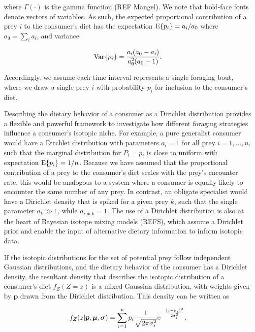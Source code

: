 \documentclass{frontiersSCNS}
\begin{document}
\noindent where $\Gamma(\cdot)$ is the gamma function (REF Mangel).
We note that bold-face fonts denote vectors of variables.
As such, the expected proportional contribution of a prey $i$ to the consumer's diet has the expectation ${\rm E}\{p_i\}=a_i/a_0$ where $a_0 = \sum_i a_i$, and variance

\begin{equation}
  \label{eqDirVar}
  {\rm Var}\{p_i\} = \frac{a_i(a_0 - a_i)}{a_0^2(a_0 + 1)}.
\end{equation}

\noindent Accordingly, we assume each time interval represents a single foraging bout, where we draw a single prey $i$ with probability $p_i$ for inclusion to the consumer's diet.

Describing the dietary behavior of a consumer as a Dirichlet distribution provides a flexible and powerful framework to investigate how different foraging strategies influence a consumer's isotopic niche.
For example, a pure generalist consumer would have a Dirchlet distribution with parameters $a_i = 1$ for all prey $i=1,...,n$, such that the marginal distribution for $P_i = p_i$ is close to uniform with expectation ${\rm E}\{p_i\} = 1/n$.
Because we have assumed that the proportional contribution of a prey to the consumer's diet scales with the prey's encounter rate, this would be analogous to a system where a consumer is equally likely to encounter the same number of any prey.
In contrast, an obligate specialist would have a Dirichlet density that is spiked for a given prey $k$, such that the single parameter $a_k \gg 1$, while $a_{i \neq k} = 1$.
The use of a Dirichlet distribution is also at the heart of Bayesian isotope mixing models (REFS), which assume a Dirichlet prior and enable the input of alternative dietary information to inform isotopic data.



If the isotopic distributions for the set of potential prey follow independent Gaussian distributions, and the dietary behavior of the consumer has a Dirichlet density, the resultant density that describes the isotopic distribution of a consumer's diet $f_Z(Z=z)$ is a mixed Gaussian distribution, with weights given by $\bm p$ drawn from the Dirichlet distribution.
This density can be written as

\begin{equation}
f_Z(z|{\bm p},{\bm \mu},{\bm \sigma}) = \sum_{i=1}^n p_i\frac{1}{\sqrt{2 \pi \sigma_i^2}}{\rm e}^{-\frac{(z-\mu_i)^2}{2\sigma_i^2}},
\end{equation}
\end{document}
